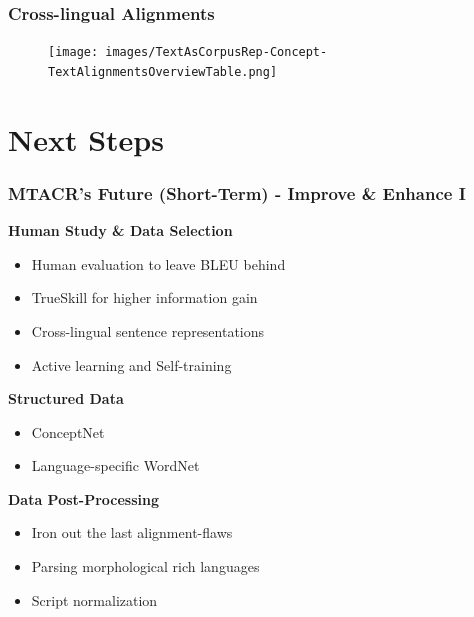 \documentclass[aspectratio=169]{beamer}
\begin{document}
\begin{frame}[fragile]
	\frametitle{Cross-lingual Alignments}
    \begin{figure}
        \centering
        \texttt{[image: images/TextAsCorpusRep-Concept-TextAlignmentsOverviewTable.png]} 
    \end{figure}
\end{frame}

\section{Next Steps}

\begin{frame}[fragile]
	\frametitle{MTACR's Future (Short-Term) - Improve \& Enhance I}
    \begin{minipage}{.50\textwidth}
    \footnotesize
    \textbf{Human Study \& Data Selection}
    \begin{itemize}
        \item Human evaluation to leave BLEU behind
        \item TrueSkill for higher information gain \citep{herbrich2006TrueSkillBayesianSkill, minka2018TrueSkill2Improveda}
        \item Cross-lingual sentence representations \citep{kowtal2024DataSelectionApproach} %
        \item Active learning and Self-training \citep{schroder2024SelfTrainingSampleEfficientActive} %
    \end{itemize}
    \textbf{Structured Data}
    \begin{itemize}
        \item ConceptNet \citep{speer2018ConceptNet55Open}
        \item Language-specific WordNet \citep{aliabadi2014BuildingKurdNetKurdish}
    \end{itemize}
    \end{minipage}%
    \begin{minipage}{.50\textwidth}
    \footnotesize
    \textbf{Data Post-Processing}
    \begin{itemize}
        \item Iron out the last alignment-flaws
        \item Parsing morphological rich languages \citep{tsarfaty2013ParsingMorphologicallyRich} %
        \item Script normalization \citep{ahmadi2023ScriptNormalizationUnconventional, ahmadi2023PALILanguageIdentification}

\end{itemize}
\end{minipage}
\end{frame}
\end{document}
